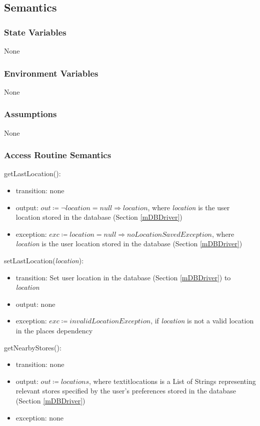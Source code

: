 \documentclass[12pt, titlepage]{article}
\begin{document}
\subsection{Semantics}

\subsubsection{State Variables}
None

\subsubsection{Environment Variables}
None

\subsubsection{Assumptions}
None

\subsubsection{Access Routine Semantics}

\noindent getLastLocation():
\begin{itemize}
\item transition: none
\item output: \( \textit{out} \coloneqq \neg location = null \Rightarrow  location \), where \textit{location} is the user location stored in the database (Section \ref{mDBDriver})
\item exception: \( \textit{exc} \coloneqq location = null \Rightarrow  noLocationSavedException \), where \textit{location} is the user location stored in the database (Section \ref{mDBDriver})
\end{itemize}

\noindent setLastLocation(\textit{location}):
\begin{itemize}
\item transition: Set user location in the database (Section \ref{mDBDriver}) to \textit{location}
\item output: none
\item exception: \( \textit{exc} \coloneqq invalidLocationException \), if \textit{location} is not a valid location in the places dependency
\end{itemize}

\noindent getNearbyStores():
\begin{itemize}
\item transition: none
\item output: \( \textit{out} \coloneqq locations \), where textit{locations} is a List of Strings representing relevant stores specified by the user's preferences stored in the database (Section \ref{mDBDriver})
\item exception: none
\end{itemize}
\end{document}
